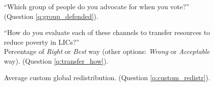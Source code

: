 \documentclass[12pt,english]{article}
\begin{document}
\begin{bibunit}
\begin{figure}[h!]
\end{figure}
\begin{figure}[h!]
    \caption[Moral circle]{``Which group of people do you advocate for when you vote?'' (Question \ref{q:group_defended}).
    }\label{fig:group_defended}
\end{figure}
\begin{figure}[h!]
    \caption[\textit{Right} or \textit{Best} way to transfer resources to LICs (global average)]{``How do you evaluate each of these channels to transfer resources to reduce poverty in LICs?''\\ Percentage of \textit{Right} or \textit{Best} way (other options: \textit{Wrong} or \textit{Acceptable} way). (Question \ref{q:transfer_how}).
    }\label{fig:transfer_how}
\end{figure}
\begin{figure}[h!]
   \caption[Average custom redistribution]{Average custom global redistribution. (Question \ref{q:custom_redistr}).
    }\label{fig:custom_redistr_question}

\end{figure}
\end{bibunit}
\end{document}
